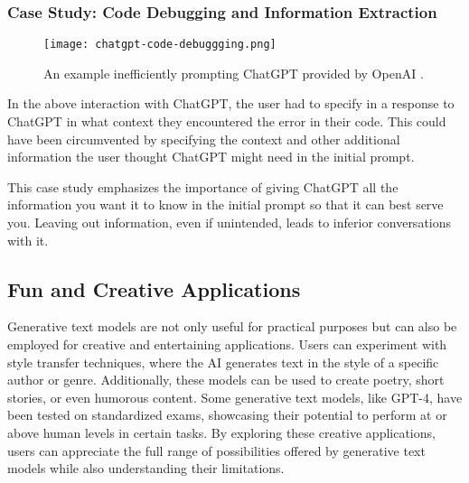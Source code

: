 \documentclass[12pt]{article}
\begin{document}
\subsubsection{Case Study: Code Debugging and Information Extraction}
\begin{figure}[H]
  \centering
  \texttt{[image: chatgpt-code-debuggging.png]}
  \caption{An example inefficiently prompting ChatGPT provided by OpenAI \cite{introducing_chatgpt_2022}.}
  \label{fig:biased code snippet}
\end{figure}

In the above interaction with ChatGPT, the user had to specify in a response to ChatGPT in what context they encountered the error in their code. This could have been circumvented by specifying the context and other additional information the user thought ChatGPT might need in the initial prompt. 

This case study emphasizes the importance of giving ChatGPT all the information you want it to know in the initial prompt so that it can best serve you. Leaving out information, even if unintended, leads to inferior conversations with it.


\subsection{Fun and Creative Applications} \label{sec:fun}
Generative text models are not only useful for practical purposes but can also be employed for creative and entertaining applications. Users can experiment with style transfer techniques, where the AI generates text in the style of a specific author or genre. Additionally, these models can be used to create poetry, short stories, or even humorous content. Some generative text models, like GPT-4, have been tested on standardized exams, showcasing their potential to perform at or above human levels in certain tasks. By exploring these creative applications, users can appreciate the full range of possibilities offered by generative text models while also understanding their limitations.
\end{document}
